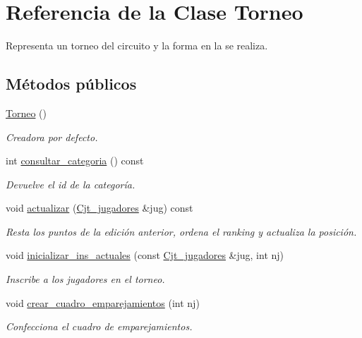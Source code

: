\hypertarget{class_torneo}{}\section{Referencia de la Clase Torneo}
\label{class_torneo}


Representa un torneo del circuito y la forma en la se realiza.  


\subsection*{Métodos públicos}
\begin{DoxyCompactItemize}
\item 
\hyperlink{class_torneo_a7bf6d35a7ec8d0e13a0bed8deb8add3e}{Torneo} ()
\begin{DoxyCompactList}\small\item\em Creadora por defecto. \end{DoxyCompactList}\item 
int \hyperlink{class_torneo_ac558198d579c88ab11b873ed3cf0953d}{consultar\+\_\+categoria} () const
\begin{DoxyCompactList}\small\item\em Devuelve el id de la categoría. \end{DoxyCompactList}\item 
void \hyperlink{class_torneo_a817ee4377de539e5292eb1491d2f9b29}{actualizar} (\hyperlink{class_cjt__jugadores}{Cjt\+\_\+jugadores} \&jug) const
\begin{DoxyCompactList}\small\item\em Resta los puntos de la edición anterior, ordena el ranking y actualiza la posición. \end{DoxyCompactList}\item 
void \hyperlink{class_torneo_a0d4f0e3c6128b5ca07dc74e88daf4da7}{inicializar\+\_\+ins\+\_\+actuales} (const \hyperlink{class_cjt__jugadores}{Cjt\+\_\+jugadores} \&jug, int nj)
\begin{DoxyCompactList}\small\item\em Inscribe a los jugadores en el torneo. \end{DoxyCompactList}\item 
void \hyperlink{class_torneo_afbbadc7c5829d021921caf2ae9a2d2ee}{crear\+\_\+cuadro\+\_\+emparejamientos} (int nj)
\begin{DoxyCompactList}\small\item\em Confecciona el cuadro de emparejamientos. \end{DoxyCompactList}\item 

\end{DoxyCompactItemize}
